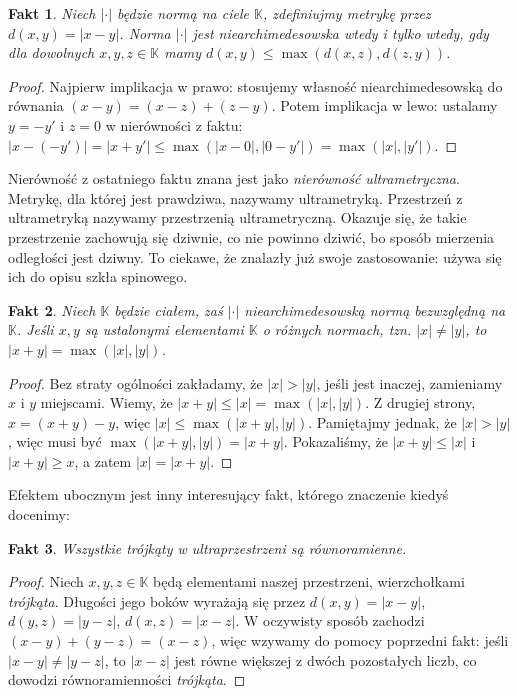 \documentclass[a4paper,fleqn,9pt]{extarticle}
\newtheorem{fkt}{Fakt}
\begin{document}
\begin{fkt}
Niech $|\cdot|$ będzie normą na ciele $\mathbb K$, zdefiniujmy metrykę przez $d(x,y) = |x-y|$.
Norma $|\cdot|$ jest niearchimedesowska wtedy i tylko wtedy, gdy dla dowolnych $x,y,z\in\mathbb K$ mamy $d(x,y) \le \max(d(x,z), d(z,y))$.
\end{fkt}

\begin{proof}
Najpierw implikacja w prawo: stosujemy własność niearchimedesowską do równania $(x-y) = (x-z) + (z-y)$.
Potem implikacja w lewo: ustalamy $y = -y'$ i $z=0$ w nierówności z faktu: $|x- (-y')| = |x+y'| \le \max (|x-0|, |0-y'|) = \max (|x|, |y'|)$.
\end{proof}

Nierówność z ostatniego faktu znana jest jako \emph{nierówność ultrametryczna}.
Metrykę, dla której jest prawdziwa, nazywamy ultrametryką. 
Przestrzeń z ultrametryką nazywamy przestrzenią ultrametryczną. 
Okazuje się, że takie przestrzenie zachowują się dziwnie, co nie powinno dziwić, bo sposób mierzenia odległości jest dziwny.
To ciekawe, że znalazły już swoje zastosowanie: używa się ich do opisu szkła spinowego.

\begin{fkt}Niech $\mathbb K$ będzie ciałem, zaś $|\cdot|$ niearchimedesowską normą bezwzględną na $\mathbb K$. Jeśli $x,y$ są ustalonymi elementami $\mathbb K$ o różnych normach, tzn. $|x| \neq |y|$, to $|x+y| = \max(|x|, |y|)$.\end{fkt}

\begin{proof}Bez straty ogólności zakładamy, że $|x| > |y|$, jeśli jest inaczej, zamieniamy $x$ i $y$ miejscami. Wiemy, że $|x+y| \le |x| = \max(|x|, |y|)$. Z drugiej strony, $x = (x+y) - y$, więc $|x| \le \max(|x+y|, |y|)$. Pamiętajmy jednak, że $|x| > |y|$, więc musi być $\max(|x+y|, |y|) = |x+y|$. Pokazaliśmy, że $|x+y| \le |x|$ i $|x+y| \ge x$, a zatem $|x| = |x+y|$.\end{proof}

Efektem ubocznym jest inny interesujący fakt, którego znaczenie kiedyś docenimy:

\begin{fkt}Wszystkie \emph{trójkąty} w ultraprzestrzeni są równoramienne.\end{fkt}

\begin{proof}Niech $x,y,z\in\mathbb K$ będą elementami naszej przestrzeni, wierzchołkami \emph{trójkąta}. Długości jego boków wyrażają się przez $d(x,y) = |x-y|$, $d(y,z) = |y-z|$, $d(x,z) = |x-z|$. W oczywisty sposób zachodzi $(x-y) + (y-z) = (x-z)$, więc wzywamy do pomocy poprzedni fakt: jeśli $|x-y| \neq |y-z|$, to $|x-z|$ jest równe większej z dwóch pozostałych liczb, co dowodzi równoramienności \emph{trójkąta}. \end{proof}
\end{document}
